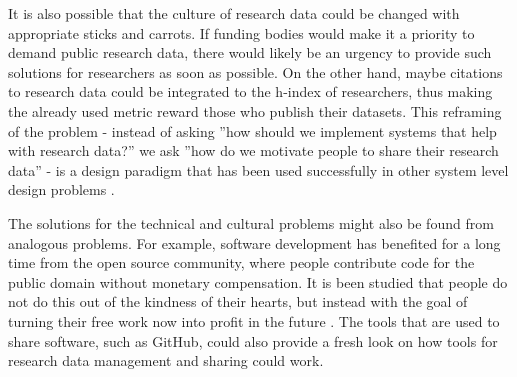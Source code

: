 It is also possible that the culture of research data could be changed with
appropriate sticks and carrots. If funding bodies would make it a priority
to demand public research data, there would likely be an urgency to provide
such solutions for researchers as soon as possible. On the other hand, maybe
citations to research data could be integrated to the h-index of researchers,
thus making the already used metric reward those who publish their datasets.
This reframing of the problem - instead of asking ''how should we implement
systems that help with research data?'' we ask ''how do we motivate people
to share their research data'' - is a design paradigm that has been used
successfully in other system level design problems \cite{dorst2015frame}.

The solutions for the technical and cultural problems might also be found
from analogous problems. For example, software development has benefited for
a long time from the open source community, where people contribute code for
the public domain without monetary compensation. It is been studied that people do not
do this out of the kindness of their hearts, but instead with the goal of
turning their free work now into profit in the future
\cite{DBLP:conf/hicss/HarsO01}. The tools that are used to share software,
such as GitHub, could also provide a fresh look on how tools for research
data management and sharing could work.

\iffalse
In this chapter we will discuss the findings, methods and such in a good
scientific manner.

At some point I want to discuss the analogue of software open source community
and how that works - how we should make people proud of making good, usable
datasets and sharing them.

\cite{DBLP:conf/hicss/HarsO01} is about the motivations behind working on open
source software - could be used for analogue for open data.

\cite{dorst2015frame} is the Kees Dorst book about reframing problems, which in
this case would be taking the technical problem of sharing reserch data, which
is not the actual problem, and reframing it as the problem on how to motivat
people to to share their data.
\fi
